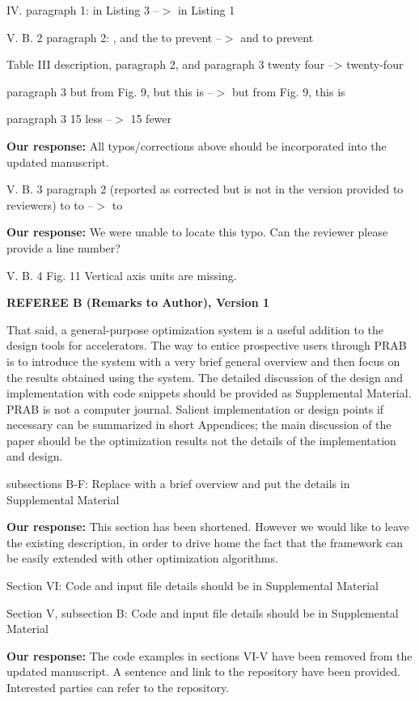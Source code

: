 \documentclass{article}
\begin{document}
IV. paragraph 1:
in Listing 3 --$>$ in Listing 1

V. B. 2 paragraph 2:
, and the to prevent --$>$ and to prevent

Table III description, paragraph 2, and paragraph 3
twenty four --> twenty-four

paragraph 3
but from Fig. 9, but this is --$>$ but from Fig. 9, this is

paragraph 3
15 less --$>$ 15 fewer

{\bf Our response:} {\color{blue} All typos/corrections above should be incorporated into the updated manuscript.}

V. B. 3
paragraph 2 (reported as corrected but is not in the version provided
to reviewers)
to to --$>$ to

{\bf Our response:} {\color{blue} 
	We were unable to locate this typo. Can the reviewer please provide a line number?}

V. B. 4
Fig. 11 Vertical axis units are missing.




{\bf REFEREE B (Remarks to Author), Version 1}

\vspace{1em}
That said, a general-purpose optimization system is a useful addition
to the design tools for accelerators. The way to entice prospective
users through PRAB is to introduce the system with a very brief
general overview and then focus on the results obtained using the
system. The detailed discussion of the design and implementation with
code snippets should be provided as Supplemental Material. PRAB is not
a computer journal. Salient implementation or design points if
necessary can be summarized in short Appendices; the main discussion
of the paper should be the optimization results not the details of the
implementation and design. 

subsections B-F:
Replace with a brief overview and put the details in Supplemental
Material

{\bf Our response: } {\color{blue} This section has been shortened. However we would like to 
leave the existing description, in order to drive home the fact that the framework can be 
easily extended with other optimization algorithms.}

Section VI: 
Code and input file details should be in Supplemental Material

Section V, subsection B:
Code and input file details should be in Supplemental Material

{\bf Our response:} {\color{blue} The code examples in sections VI-V have been removed from the updated manuscript. 
	A sentence and link to the repository have been provided. Interested parties can refer to the repository.}



 
\end{document}
